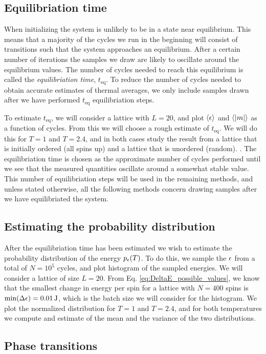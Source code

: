 \subsection{Equilibriation time}\label{subsec_methods:equilibriation_time}
When initializing the system is unlikely to be in a state near equilibrium. This means that a majority of the cycles we run in the beginning will consist of transitions such that the system approaches an equilibrium. After a certain number of iterations the samples we draw are likely to oscillate around the equilibrium values. The number of cycles needed to reach this equilibrium is called the \textit{equilibriation time}, $t_\mathrm{eq}$. To reduce the number of cycles needed to obtain accurate estimates of thermal averages, we only include samples drawn after we have performed $t_\mathrm{eq}$ equilibriation steps. 

To estimate $t_\mathrm{eq}$, we will consider a lattice with $L=20$, and plot $\expval{\epsilon}$ and $\expval{\abs{m}}$ as a function of cycles. From this we will choose a rough estimate of $t_\mathrm{eq}$. We will do this for $T=1$ and $T=2.4$, and in both cases study the result from a lattice that is initially ordered (all spins up) and a lattice that is unordered (random). . The equilibriation time is chosen as the approximate number of cycles performed until we see that the measured quantities oscillate around a somewhat stable value. This number of equilibriation steps will be used in the remaining methods, and unless stated otherwise, all the following methods concern drawing samples after we have equilibriated the system.     



\subsection{Estimating the probability distribution}\label{subsec_methods:histogram}
After the equilibriation time has been estimated we wish to estimate the probability distribution of the energy $p_\epsilon(T)$. To do this, we sample the $\epsilon$ from a total of $N=10^5$ cycles, and plot histogram of the sampled energies. We will consider a lattice of size $L=20$. From Eq. \eqref{eq:DeltaE_possible_values}, we know that the smallest change in energy per spin for a lattice with $N=400$ spins is $\min(\Delta\epsilon)=0.01\,\mathrm{J}$, which is the batch size we will consider for the histogram. We plot the normalized distribution for $T=1$ and $T=2.4$, and for both temperatures we compute and estimate of the mean and the variance of the two distributions.     


\subsection{Phase transitions}\label{subsec_methods:PT}